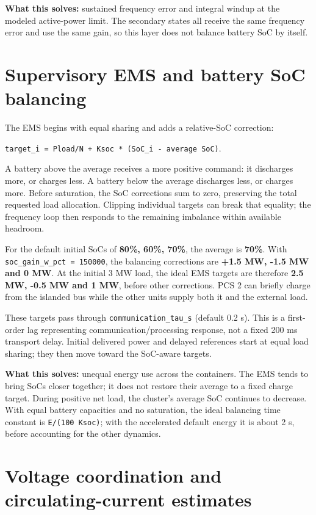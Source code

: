 \documentclass[11pt,a4paper]{article}
\begin{document}
\textbf{What this solves:} sustained frequency error and integral windup at the modeled active-power limit. The secondary states all receive the same frequency error and use the same gain, so this layer does not balance battery SoC by itself.

\section{Supervisory EMS and battery SoC balancing}

The EMS begins with equal sharing and adds a relative-SoC correction:

\texttt{target\_i = Pload/N + Ksoc  *  (SoC\_i - average SoC)}.

A battery above the average receives a more positive command: it discharges more, or charges less. A battery below the average discharges less, or charges more. Before saturation, the SoC corrections sum to zero, preserving the total requested load allocation. Clipping individual targets can break that equality; the frequency loop then responds to the remaining imbalance within available headroom.

For the default initial SoCs of \textbf{80\%, 60\%, 70\%}, the average is \textbf{70\%}. With \texttt{soc\_gain\_w\_pct = 150000}, the balancing corrections are \textbf{+1.5 MW, -1.5 MW and 0 MW}. At the initial 3 MW load, the ideal EMS targets are therefore \textbf{2.5 MW, -0.5 MW and 1 MW}, before other corrections. PCS 2 can briefly charge from the islanded bus while the other units supply both it and the external load.

These targets pass through \texttt{communication\_tau\_s} (default 0.2 s). This is a first-order lag representing communication/processing response, not a fixed 200 ms transport delay. Initial delivered power and delayed references start at equal load sharing; they then move toward the SoC-aware targets.

\textbf{What this solves:} unequal energy use across the containers. The EMS tends to bring SoCs closer together; it does not restore their average to a fixed charge target. During positive net load, the cluster's average SoC continues to decrease. With equal battery capacities and no saturation, the ideal balancing time constant is \texttt{E/(100 Ksoc)}; with the accelerated default energy it is about 2 s, before accounting for the other dynamics.

\section{Voltage coordination and circulating-current estimates}
\end{document}
